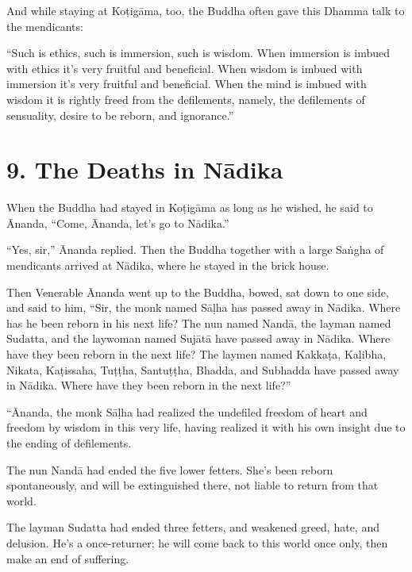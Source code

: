 \documentclass[12pt,openany]{book}%
\begin{document}
And while staying at \textsanskrit{Koṭigāma}, too, the Buddha often gave this Dhamma talk to the mendicants: 

“Such is ethics, such is immersion, such is wisdom. When immersion is imbued with ethics it’s very fruitful and beneficial. When wisdom is imbued with immersion it’s very fruitful and beneficial. When the mind is imbued with wisdom it is rightly freed from the defilements, namely, the defilements of sensuality, desire to be reborn, and ignorance.” 

\section*{9. The Deaths in \textsanskrit{Nādika} }

When the Buddha had stayed in \textsanskrit{Koṭigāma} as long as he wished, he said to Ānanda, “Come, Ānanda, let’s go to \textsanskrit{Nādika}.” 

“Yes, sir,” Ānanda replied. Then the Buddha together with a large \textsanskrit{Saṅgha} of mendicants arrived at \textsanskrit{Nādika}, where he stayed in the brick house. 

Then Venerable Ānanda went up to the Buddha, bowed, sat down to one side, and said to him, “Sir, the monk named \textsanskrit{Sāḷha} has passed away in \textsanskrit{Nādika}. Where has he been reborn in his next life? The nun named \textsanskrit{Nandā}, the layman named Sudatta, and the laywoman named \textsanskrit{Sujātā} have passed away in \textsanskrit{Nādika}. Where have they been reborn in the next life? The laymen named \textsanskrit{Kakkaṭa}, \textsanskrit{Kaḷibha}, Nikata, \textsanskrit{Kaṭissaha}, \textsanskrit{Tuṭṭha}, \textsanskrit{Santuṭṭha}, Bhadda, and Subhadda have passed away in \textsanskrit{Nādika}. Where have they been reborn in the next life?” 

“Ānanda, the monk \textsanskrit{Sāḷha} had realized the undefiled freedom of heart and freedom by wisdom in this very life, having realized it with his own insight due to the ending of defilements. 

The nun \textsanskrit{Nandā} had ended the five lower fetters. She’s been reborn spontaneously, and will be extinguished there, not liable to return from that world. 

The layman Sudatta had ended three fetters, and weakened greed, hate, and delusion. He’s a once-returner; he will come back to this world once only, then make an end of suffering. 
\end{document}
